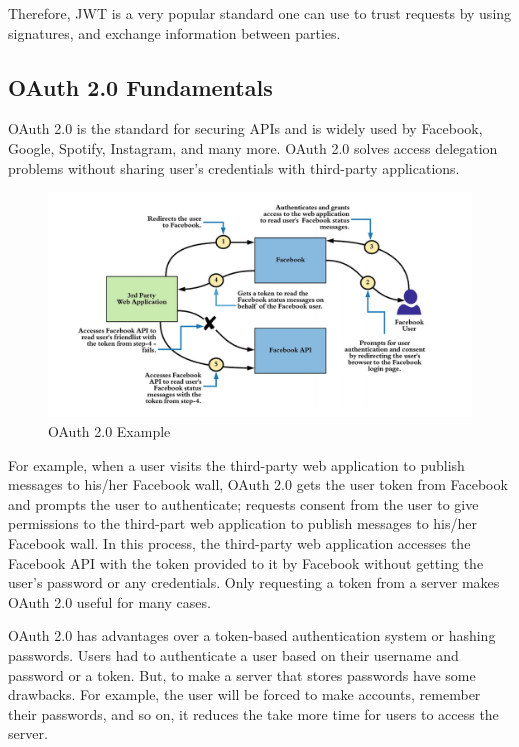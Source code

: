 \documentclass[11pt]{article}
\begin{document}
Therefore, JWT is a very popular standard one can use to trust requests by using signatures, and exchange information between parties. 

\subsection{OAuth 2.0 Fundamentals}

OAuth 2.0 is the standard for securing APIs and is widely used by Facebook, Google, Spotify, Instagram, and many more. OAuth 2.0 solves access delegation problems without sharing user’s credentials with third-party applications. 

\begin{figure}[!htbp]
    \centering
    \includegraphics[width=1\textwidth]{facebok.PNG}
    \caption{OAuth 2.0 Example \cite{siriwardena2014advanced}}
    \label{fig:facebok}

\end{figure}

For example, when a user visits the third-party web application to publish messages to his/her Facebook wall, OAuth 2.0 gets the user token from Facebook and prompts the user to authenticate; requests consent from the user to give permissions to the third-part web application to publish messages to his/her Facebook wall. In this process, the third-party web application accesses the Facebook API with the token provided to it by Facebook without getting the user's password or any credentials. Only requesting a token from a server makes OAuth 2.0 useful for many cases.

OAuth 2.0 has advantages over a token-based authentication system or hashing passwords. Users had to authenticate a user based on their username and password or a token. But, to make a server that stores passwords have some drawbacks. For example, the user will be forced to make accounts, remember their passwords, and so on, it reduces the take more time for users to access the server. 
\end{document}
